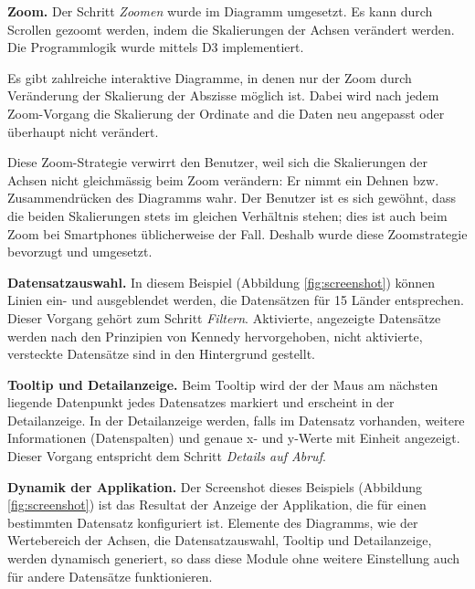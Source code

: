 \textbf{Zoom.} Der Schritt \textit{Zoomen} wurde im Diagramm umgesetzt. Es kann durch Scrollen gezoomt werden, indem die Skalierungen der Achsen verändert werden. Die Programmlogik wurde mittels D3 implementiert. 

Es gibt zahlreiche interaktive Diagramme, in denen nur der Zoom durch Veränderung der Skalierung der Abszisse möglich ist. Dabei wird nach jedem Zoom-Vorgang die Skalierung der Ordinate and die Daten neu angepasst oder überhaupt nicht verändert.

Diese Zoom-Strategie verwirrt den Benutzer, weil sich die Skalierungen der Achsen nicht gleichmässig beim Zoom verändern: Er nimmt ein Dehnen bzw. Zusammendrücken des Diagramms wahr. Der Benutzer ist es sich gewöhnt, dass die beiden Skalierungen stets im gleichen Verhältnis stehen; dies ist auch beim Zoom bei Smartphones üblicherweise der Fall. Deshalb wurde diese Zoomstrategie bevorzugt und umgesetzt.

\textbf{Datensatzauswahl.} In diesem Beispiel (Abbildung \ref{fig:screenshot}) können Linien ein- und ausgeblendet werden, die Datensätzen für 15 Länder entsprechen. Dieser Vorgang gehört zum Schritt \textit{Filtern}. Aktivierte, angezeigte Datensätze werden nach den Prinzipien von Kennedy hervorgehoben, nicht aktivierte, versteckte Datensätze sind in den Hintergrund gestellt.

\textbf{Tooltip und Detailanzeige.} Beim Tooltip wird der der Maus am nächsten liegende Datenpunkt jedes Datensatzes markiert und erscheint in der Detailanzeige. In der Detailanzeige werden, falls im Datensatz vorhanden, weitere Informationen (Datenspalten) und genaue x- und y-Werte mit Einheit angezeigt. Dieser Vorgang entspricht dem Schritt \textit{Details auf Abruf}.

\textbf{Dynamik der Applikation.} Der Screenshot dieses Beispiels (Abbildung \ref{fig:screenshot}) ist das Resultat der Anzeige der Applikation, die für einen bestimmten Datensatz konfiguriert ist. Elemente des Diagramms, wie der Wertebereich der Achsen, die Datensatzauswahl, Tooltip und Detailanzeige, werden dynamisch generiert, so dass diese Module ohne weitere Einstellung auch für andere Datensätze funktionieren.

